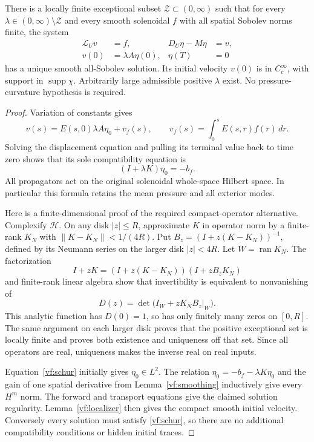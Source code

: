 \begin{theorem}\label{vf:inverse}
There is a locally finite exceptional subset $\mathcal Z\subset(0,\infty)$
such that for every $\lambda\in(0,\infty)\setminus\mathcal Z$ and every
smooth solenoidal $f$ with all spatial Sobolev norms finite, the system
\begin{align*}
 \mathcal L_Uv&=f,& D_U\eta-M\eta&=v,\\
 v(0)&=\lambda A\eta(0),&\eta(T)&=0
\end{align*}
has a unique smooth all-Sobolev solution. Its initial velocity $v(0)$ is
in $C_c^\infty$, with support in $\operatorname{supp}\chi$.
Arbitrarily large admissible positive $\lambda$ exist.
No pressure-curvature hypothesis is required.
\end{theorem}
\begin{proof}
Variation of constants gives
\[
 v(s)=E(s,0)\lambda A\eta_0+v_f(s),\qquad
 v_f(s)=\int_0^sE(s,r)f(r)\,dr.
\]
Solving the displacement equation and pulling its terminal value back to
time zero shows that its sole compatibility equation is
\begin{equation}\label{vf:schur}
 (I+\lambda K)\eta_0=-b_f.
\end{equation}
All propagators act on the original solenoidal whole-space Hilbert space.
In particular this formula retains the mean pressure and all exterior modes.

Here is a finite-dimensional proof of the required compact-operator
alternative. Complexify $\mathcal H$. On any disk $|z|\le R$, approximate
$K$ in operator norm by a finite-rank $K_N$ with
$\|K-K_N\|<1/(4R)$. Put $B_z=(I+z(K-K_N))^{-1}$, defined by its
Neumann series on the larger disk $|z|<4R$.
Let $W=\operatorname{ran}K_N$. The factorization
\[
 I+zK=(I+z(K-K_N))(I+zB_zK_N)
\]
and finite-rank linear algebra show that invertibility is equivalent to
nonvanishing of
\[
 D(z)=\det\bigl(I_W+zK_NB_z|_W\bigr).
\]
This analytic function has $D(0)=1$, so has only finitely many zeros on
$[0,R]$. The same argument on each larger disk proves that the positive
exceptional set is locally finite and proves both existence and uniqueness
off that set. Since all operators are real, uniqueness makes the inverse
real on real inputs.

Equation~\eqref{vf:schur} initially gives $\eta_0\in L^2$.
The relation $\eta_0=-b_f-\lambda K\eta_0$ and the gain of one
spatial derivative from Lemma~\ref{vf:smoothing} inductively give every
$H^m$ norm. The forward and transport equations give the claimed solution
regularity. Lemma~\ref{vf:localizer} then gives the compact smooth initial
velocity. Conversely every solution must satisfy \eqref{vf:schur}, so
there are no additional compatibility conditions or hidden initial traces.
\end{proof}

